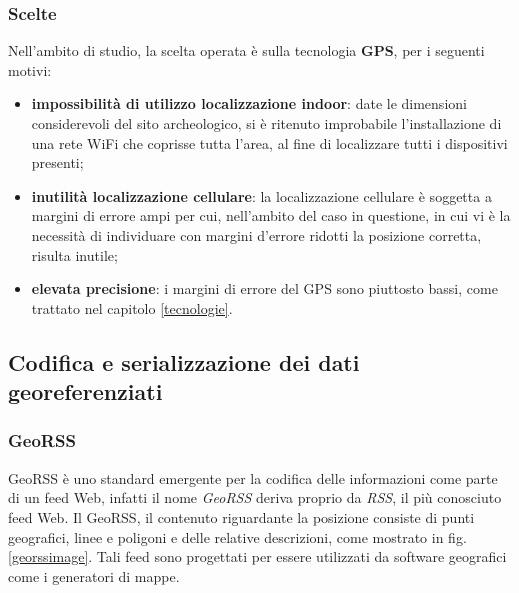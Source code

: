 \subsubsection{Scelte}
Nell'ambito di studio, la scelta operata è sulla tecnologia \textbf{GPS}, per i seguenti motivi:
\begin{itemize}
\item \textbf{impossibilità di utilizzo localizzazione indoor}: date le dimensioni considerevoli del sito archeologico, si è ritenuto improbabile l'installazione di una rete WiFi che coprisse tutta l'area, al fine di localizzare tutti i dispositivi presenti;
\item \textbf{inutilità localizzazione cellulare}: la localizzazione cellulare è soggetta a margini di errore ampi per cui, nell'ambito del caso in questione, in cui vi è la necessità di individuare con margini d'errore ridotti la posizione corretta, risulta inutile;
\item \textbf{elevata precisione}: i margini di errore del GPS sono piuttosto bassi, come trattato nel capitolo \ref{tecnologie}.
\end{itemize}


\clearpage{\pagestyle{empty}\cleardoublepage}

\subsection{Codifica e serializzazione dei dati georeferenziati}
\subsubsection{GeoRSS}
GeoRSS è uno standard emergente per la codifica delle informazioni come parte di un feed Web, infatti il nome \emph{GeoRSS} deriva proprio da \emph{RSS}, il più conosciuto feed Web.
Il GeoRSS, il contenuto riguardante la posizione consiste di punti geografici, linee e poligoni e delle relative descrizioni, come mostrato in fig. \ref{georssimage}. Tali feed sono progettati per essere utilizzati da software geografici come i generatori di mappe.

